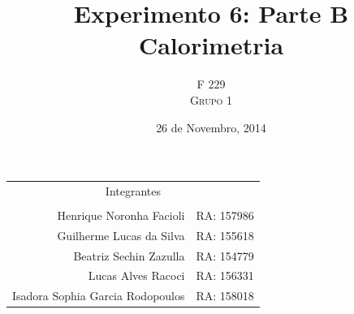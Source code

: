 \documentclass[a4paper]{article}
\title{Experimento 6:  Parte B \\ Calorimetria} %
\author{F 229 \\ \textsc{Grupo 1}}
\date{26 de Novembro, 2014}
\providecommand{\tabularnewline}{\\}
\begin{document}
	\maketitle



	\begin{center}
		\begin{tabular}{rr}
			\multicolumn{2}{c}{Integrantes}\tabularnewline
			                                  & \tabularnewline
			        Henrique Noronha Facioli  & RA: 157986 \tabularnewline
			        Guilherme Lucas da Silva  & RA: 155618 \tabularnewline
			          Beatriz Sechin Zazulla  & RA: 154779 \tabularnewline
			              Lucas Alves Racoci  & RA: 156331 \tabularnewline
			Isadora Sophia Garcia Rodopoulos  & RA: 158018 \tabularnewline
		\end{tabular}
	\par\end{center}

\end{document}
